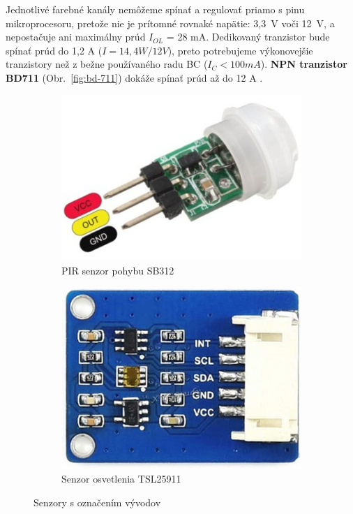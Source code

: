 \documentclass[12pt, a4paper]{article}
\begin{document}
Jednotlivé farebné kanály nemôžeme spínať a regulovať priamo s pinu mikroprocesoru, pretože nie je prítomné rovnaké napätie: 3,3~V voči 12~V, a nepostačuje ani maximálny prúd $I_{OL}$ = 28 mA. Dedikovaný tranzistor bude spínať prúd do 1,2 A ($I = 14,4W / 12V$), preto potrebujeme výkonovejšie tranzistory než z bežne používaného radu BC ($I_C < 100 mA$). \textbf{NPN tranzistor BD711} (Obr.~\ref{fig:bd-711}) dokáže spínať prúd až do 12 A \cite{noauthor_bd711_nodate}.

\begin{figure}[h]
\centering
\begin{subfigure}[b]{0.4\textwidth}
	\centering
	\includegraphics[width=\textwidth]{assets/pir-sb312.jpg}
	\caption{PIR senzor pohybu SB312}
	\label{fig:pir}
\end{subfigure}
\hfill
\begin{subfigure}[b]{0.4\textwidth}
	\centering
	\includegraphics[width=\textwidth]{assets/tsl25911.jpg}
	\caption{Senzor osvetlenia TSL25911}
	\label{fig:light-sensor}
\end{subfigure}
\caption{Senzory s označením vývodov}
\end{figure}
\end{document}
